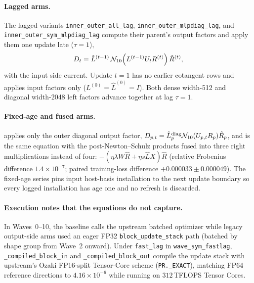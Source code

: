 \paragraph{Lagged arms.}
The lagged variants \texttt{inner\_\allowbreak outer\_\allowbreak all\_lag},
\texttt{inner\_\allowbreak outer\_\allowbreak mlpdiag\_lag}, and
\texttt{inner\_\allowbreak outer\_\allowbreak sym\_\allowbreak mlpdiag\_lag}
compute their parent's output factors and apply them one update late ($\tau=1$),
\[
D_t=\hat L^{(t-1)}\,\mathcal{N}_{10}\!\left(L^{(t-1)}U_tR^{(t)}\right)\hat R^{(t)} ,
\]
with the input side current. Update $t=1$ has no earlier cotangent rows and
applies input factors only ($L^{(0)}=\hat L^{(0)}=I$). Both dense width-512 and
diagonal width-2048 left factors advance together at lag $\tau=1$.

\paragraph{Fixed-age and fused arms.}
\outerdiag{} applies only the outer diagonal output factor,
$D_{p,t}=\hat L^{\text{diag}}_p\mathcal{N}_{10}(U_{p,t}R_p)\hat R_p$, and \fused{} is the
same equation with the post-Newton--Schulz products fused into three right
multiplications instead of four:
$-(\eta\lambda W\hat R+\eta s\hat L X)\hat R$ (relative Frobenius difference
$1.4\times10^{-7}$; paired training-loss difference $+0.000033 \pm 0.000049$).
The fixed-age series pins input host-basis installation to the next update
boundary so every logged installation has age one and no refresh is discarded.

\paragraph{Execution notes that the equations do not capture.}
In Waves~0--10, the baseline calls the upstream batched optimizer while legacy
output-side arms used an eager FP32 \texttt{block\_update\_stack} path (batched
by shape group from Wave~2 onward). Under \texttt{fast\_lag} in
\texttt{wave\_sym\_fastlag}, \texttt{\_compiled\_\allowbreak block\_in} and
\texttt{\_compiled\_\allowbreak block\_out} compile the update stack with
upstream's Ozaki FP16-split Tensor-Core scheme (\texttt{PR.\_EXACT}), matching
FP64 reference directions to $4.16\times 10^{-6}$ while running on $312$\,TFLOPS
Tensor Cores.
